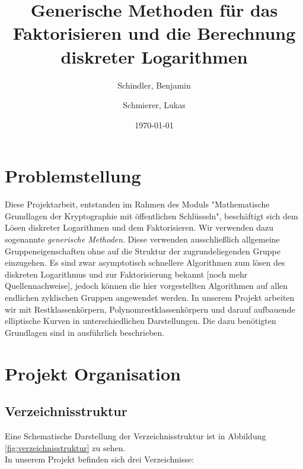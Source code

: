 \documentclass{scrartcl}
\begin{document}
\titlehead{
  Universität Leipzig \\
  Fakultät für Mathematik und Informatik \\
  Institut für Informatik
}
\subject{Projekt Dokumentation}
\title{Generische Methoden für das Faktorisieren und die Berechnung diskreter Logarithmen}
\author{Schindler, Benjamin \and Schmierer, Lukas}
\date{\today}
\publishers{Dr. Claus Diem}
\maketitle

\tableofcontents

\section{Problemstellung}
Diese Projektarbeit, entstanden im Rahmen des Moduls "Mathematische Grundlagen der Kryptographie mit öffentlichen Schlüsseln", beschäftigt sich dem Lösen diskreter Logarithmen und dem Faktorisieren. Wir verwenden dazu sogenannte \emph{generische Methoden}. Diese verwenden ausschließlich allgemeine Gruppeneigenschaften ohne auf die Struktur der zugrundeliegenden Gruppe einzugehen. Es sind zwar asymptotisch schnellere Algorithmen zum lösen des diskreten Logarithmus und zur Faktorisierung bekannt \cite{diem_2011, Adleman_1979}[noch mehr Quellennachweise], jedoch können die hier vorgestellten Algorithmen auf allen endlichen zyklischen Gruppen angewendet werden. In unserem Projekt arbeiten wir mit Restklassenkörpern, Polynomrestklassenkörpern und darauf aufbauende elliptische Kurven in unterschiedlichen Darstellungen. Die dazu benötigten Grundlagen sind in \cite{Galbraith2012} ausführlich beschrieben. 
\section{Projekt Organisation}
\label{sec:organisation}

\subsection{Verzeichnisstruktur}
\label{sec:verzeichnisstruktur}
Eine Schematische Darstellung der Verzeichnisstruktur ist in Abbildung \ref{fig:verzeichnisstruktur} zu sehen.\\
In unserem Projekt befinden sich drei Verzeichnisse:
\end{document}
